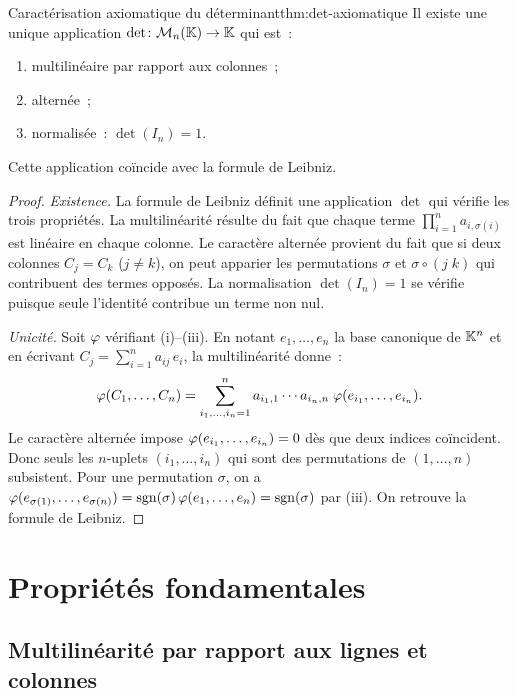 \begin{theorem}{Caractérisation axiomatique du déterminant}{thm:det-axiomatique}
  Il existe une unique application
  $\det\colon\mathcal{M}_n({\mathbb{K}})\to{\mathbb{K}}$ qui est~:
  \begin{enumerate}[label=(\roman*)]
    \item multilinéaire par rapport aux colonnes~;
    \item alternée~;
    \item normalisée~: $\det(I_n)=1$.
  \end{enumerate}
  Cette application coïncide avec la formule de Leibniz.
\end{theorem}

\begin{proof}
  \emph{Existence.} La formule de Leibniz définit une application
  $\det$ qui vérifie les trois propriétés. La multilinéarité résulte du
  fait que chaque terme $\prod_{i=1}^n a_{i,\sigma(i)}$ est linéaire en
  chaque colonne. Le caractère alternée provient du fait que si deux
  colonnes $C_j=C_k$ ($j\neq k$), on peut apparier les permutations
  $\sigma$ et $\sigma\circ(j\;k)$ qui contribuent des termes opposés. La
  normalisation $\det(I_n)=1$ se vérifie puisque seule l'identité
  contribue un terme non nul.

  \emph{Unicité.} Soit $\varphi$ vérifiant (i)--(iii). En notant
  $e_1,\ldots,e_n$ la base canonique de ${\mathbb{K}}^n$ et en écrivant
  $C_j=\sum_{i=1}^n a_{ij}\,e_i$, la multilinéarité donne~:
  \[
    \varphi(C_1,\ldots,C_n)
    =\sum_{i_1,\ldots,i_n=1}^n a_{i_1,1}\cdots a_{i_n,n}\;
    \varphi(e_{i_1},\ldots,e_{i_n}).
  \]
  Le caractère alternée impose $\varphi(e_{i_1},\ldots,e_{i_n})=0$ dès que
  deux indices coïncident. Donc seuls les $n$-uplets $(i_1,\ldots,i_n)$
  qui sont des permutations de $(1,\ldots,n)$ subsistent. Pour une
  permutation $\sigma$, on a
  $\varphi(e_{\sigma(1)},\ldots,e_{\sigma(n)})=\operatorname{sgn}(\sigma)\,\varphi(e_1,\ldots,e_n)
  =\operatorname{sgn}(\sigma)$ par (iii). On retrouve la formule de Leibniz.
\end{proof}

\section{Propriétés fondamentales}\label{sec:proprietes-det}

\subsection{Multilinéarité par rapport aux lignes et colonnes}%
\label{subsec:multilin-lignes}

